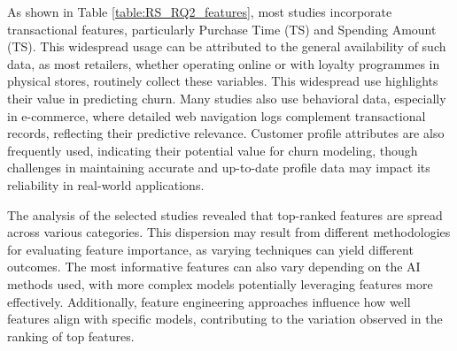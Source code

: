 As shown in Table \ref{table:RS_RQ2_features}, most studies incorporate transactional features, particularly Purchase Time (TS) and Spending Amount (TS). This widespread usage can be attributed to the general availability of such data, as most retailers, whether operating online or with loyalty programmes in physical stores, routinely collect these variables. This widespread use highlights their value in predicting churn. 
Many studies also use behavioral data, especially in e-commerce, where detailed web navigation logs complement transactional records, reflecting their predictive relevance. Customer profile attributes are also frequently used, indicating their potential value for churn modeling, though challenges in maintaining accurate and up-to-date profile data may impact its reliability in real-world applications.

The analysis of the selected studies revealed that top-ranked features are spread across various categories. This dispersion may result from different methodologies for evaluating feature importance, as varying techniques can yield different outcomes. The most informative features can also vary depending on the AI methods used, with more complex models potentially leveraging features more effectively. Additionally, feature engineering approaches influence how well features align with specific models, contributing to the variation observed in the ranking of top features.

